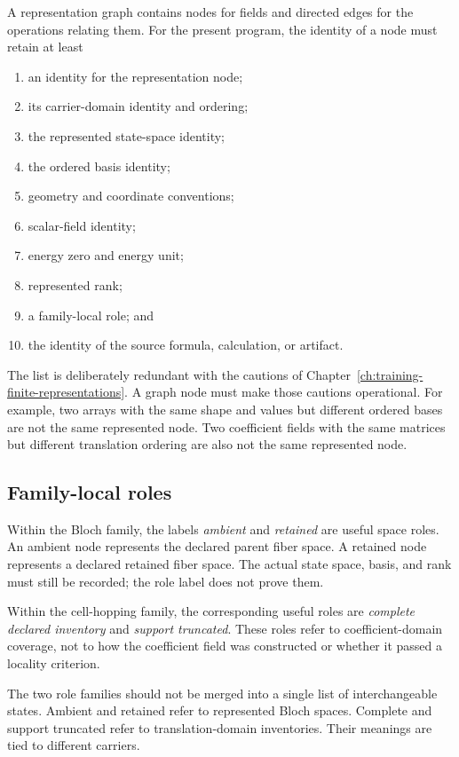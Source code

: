 A representation graph contains nodes for fields and directed edges for the
operations relating them. For the present program, the identity of a node must
retain at least

\begin{enumerate}
  \item an identity for the representation node;
  \item its carrier-domain identity and ordering;
  \item the represented state-space identity;
  \item the ordered basis identity;
  \item geometry and coordinate conventions;
  \item scalar-field identity;
  \item energy zero and energy unit;
  \item represented rank;
  \item a family-local role; and
  \item the identity of the source formula, calculation, or artifact.
\end{enumerate}

The list is deliberately redundant with the cautions of
Chapter~\ref{ch:training-finite-representations}. A graph node must make those
cautions operational. For example, two arrays with the same shape and values
but different ordered bases are not the same represented node. Two coefficient
fields with the same matrices but different translation ordering are also not
the same represented node.

\subsection{Family-local roles}

Within the Bloch family, the labels \emph{ambient} and \emph{retained} are
useful space roles. An ambient node represents the declared parent fiber space.
A retained node represents a declared retained fiber space. The actual state
space, basis, and rank must still be recorded; the role label does not prove
them.

Within the cell-hopping family, the corresponding useful roles are
\emph{complete declared inventory} and \emph{support truncated}. These roles
refer to coefficient-domain coverage, not to how the coefficient field was
constructed or whether it passed a locality criterion.

The two role families should not be merged into a single list of interchangeable
states. Ambient and retained refer to represented Bloch spaces. Complete and
support truncated refer to translation-domain inventories. Their meanings are
tied to different carriers.

